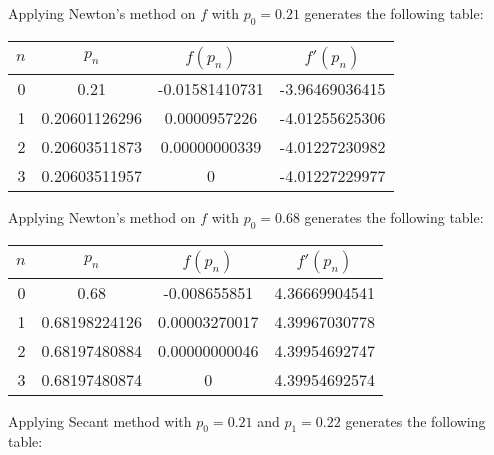 \documentclass[../../../../Assignments]{subfiles}
\begin{document}
\begin{solution}
\begin{enumerate}[label = \alph*)]
            Applying Newton's method on \(f\) with \(p_0 = \num{0.21}\)
            generates the following table:

            \begin{table}[H]
                \centering
                \begin{tabular}{r S[table-format=1.11] S[table-format=-1.11] S[table-format=-1.11]}
                    \toprule
                    \(n\)  &    {\(p_n\)}    &   {\(f(p_n)\)}   &   {\(f'(p_n)\)}  \\
                      &  0.21           &  -0.01581410731  &  -3.96469036415  \\
                        1  &  0.20601126296  &   0.0000957226   &  -4.01255625306  \\
                        2  &  0.20603511873  &   0.00000000339  &  -4.01227230982  \\
                        3  &  0.20603511957  &   0              &  -4.01227229977  \\
                    \bottomrule
                \end{tabular}
            \end{table}

            Applying Newton's method on \(f\) with \(p_0 = \num{0.68}\)
            generates the following table:

            \begin{table}[H]
                \centering
                \begin{tabular}{r S[table-format=1.11] S[table-format=-1.11] S[table-format=1.11]}
                    \toprule
                    \(n\)  &    {\(p_n\)}    &   {\(f(p_n)\)}   &  {\(f'(p_n)\)}  \\
                      &  0.68           &  -0.008655851    &  4.36669904541  \\
                        1  &  0.68198224126  &   0.00003270017  &  4.39967030778  \\
                        2  &  0.68197480884  &   0.00000000046  &  4.39954692747  \\
                        3  &  0.68197480874  &   0              &  4.39954692574  \\
                    \bottomrule
                \end{tabular}
            \end{table}

            Applying Secant method with \(p_0 = \num{0.21}\) and \(p_1 =
            \num{0.22}\) generates the following table:


\end{enumerate}
\end{solution}
\end{document}
